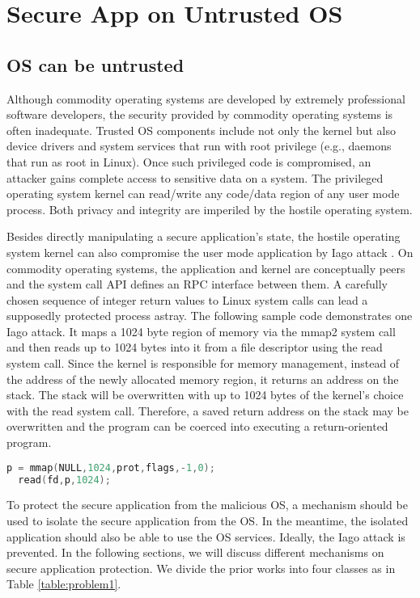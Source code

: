 \section{Secure App on Untrusted OS}
\label{sec:problem1}

\subsection{OS can be untrusted}

Although commodity operating systems are developed by extremely professional
software developers, the security provided by commodity operating systems is
often inadequate. Trusted OS components include not only the kernel but also
device drivers and system services that run with root privilege (e.g., daemons
that run as root in Linux). Once such privileged code is compromised, an
attacker gains complete access to sensitive data on a system. The privileged
operating system kernel can read/write any code/data region of any user mode
process.  Both privacy and integrity are imperiled by the hostile operating
system.

Besides directly manipulating a secure application's state, the hostile
operating system kernel can also compromise the user mode application by Iago
attack \cite{Iago}. On commodity operating systems, the application and kernel
are conceptually peers and the system call API defines an RPC interface between
them. A carefully chosen sequence of integer return values to Linux system
calls can lead a supposedly protected process astray. The following sample code
demonstrates one Iago attack. It maps a 1024 byte region of memory via the
mmap2 system call and then reads up to 1024 bytes into it from a file
descriptor using the read system call. Since the kernel is responsible for
memory management, instead of the address of the newly allocated memory region,
it returns an address on the stack.  The stack will be overwritten with up to
1024 bytes of the kernel's choice with the read system call. Therefore, a saved
return address on the stack may be overwritten and the program can be coerced
into executing a return-oriented program.

\begin{lstlisting}[language=C]
  p = mmap(NULL,1024,prot,flags,-1,0);
  read(fd,p,1024);
\end{lstlisting}

To protect the secure application from the malicious OS, a mechanism should be
used to isolate the secure application from the OS. In the meantime, the
isolated application should also be able to use the OS services. Ideally, the
Iago attack is prevented. In the following sections, we will discuss different
mechanisms on secure application protection. We divide the prior works into four
classes as in Table \ref{table:problem1}.

